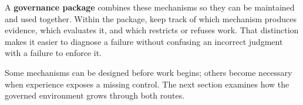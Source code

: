 




A \textbf{governance package} combines these mechanisms so they can be maintained and used together. Within the package, keep track of which mechanism produces evidence, which evaluates it, and which restricts or refuses work. That distinction makes it easier to diagnose a failure without confusing an incorrect judgment with a failure to enforce it.


Some mechanisms can be designed before work begins; others become necessary when experience exposes a missing control. The next section examines how the governed environment grows through both routes.
